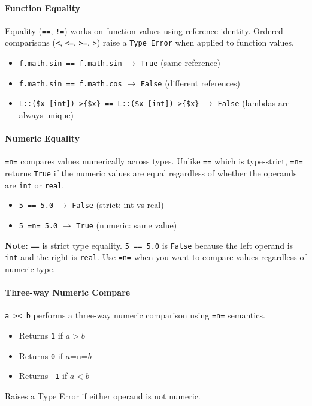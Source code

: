 \paragraph{Function Equality}
Equality (\texttt{==}, \texttt{!=}) works on function values using reference identity. Ordered comparisons (\texttt{<}, \texttt{<=}, \texttt{>=}, \texttt{>}) raise a \texttt{Type Error} when applied to function values.
\begin{itemize}
\item \texttt{f.math.sin == f.math.sin} $\rightarrow$ \texttt{True} (same reference)
\item \texttt{f.math.sin == f.math.cos} $\rightarrow$ \texttt{False} (different references)
\item \texttt{L::(\$x [int])-\texttt{>}\{\$x\} == L::(\$x [int])-\texttt{>}\{\$x\}} $\rightarrow$ \texttt{False} (lambdas are always unique)
\end{itemize}

\paragraph{Numeric Equality}
\texttt{=n=} compares values numerically across types. Unlike \texttt{==} which is type-strict, \texttt{=n=} returns \texttt{True} if the numeric values are equal regardless of whether the operands are \texttt{int} or \texttt{real}.

\begin{itemize}
\item \texttt{5 == 5.0} $\rightarrow$ \texttt{False} (strict: int vs real)
\item \texttt{5 =n= 5.0} $\rightarrow$ \texttt{True} (numeric: same value)
\end{itemize}

\textbf{Note:} \texttt{==} is strict type equality. \texttt{5 == 5.0} is \texttt{False} because the left operand is \texttt{int} and the right is \texttt{real}. Use \texttt{=n=} when you want to compare values regardless of numeric type.

\paragraph{Three-way Numeric Compare}
\texttt{a >< b} performs a three-way numeric comparison using \texttt{=n=} semantics.
\begin{itemize}
\item Returns \texttt{1} if $a > b$
\item Returns \texttt{0} if $a \mathbin{\texttt{=n=}} b$
\item Returns \texttt{-1} if $a < b$
\end{itemize}
Raises a Type Error if either operand is not numeric.

